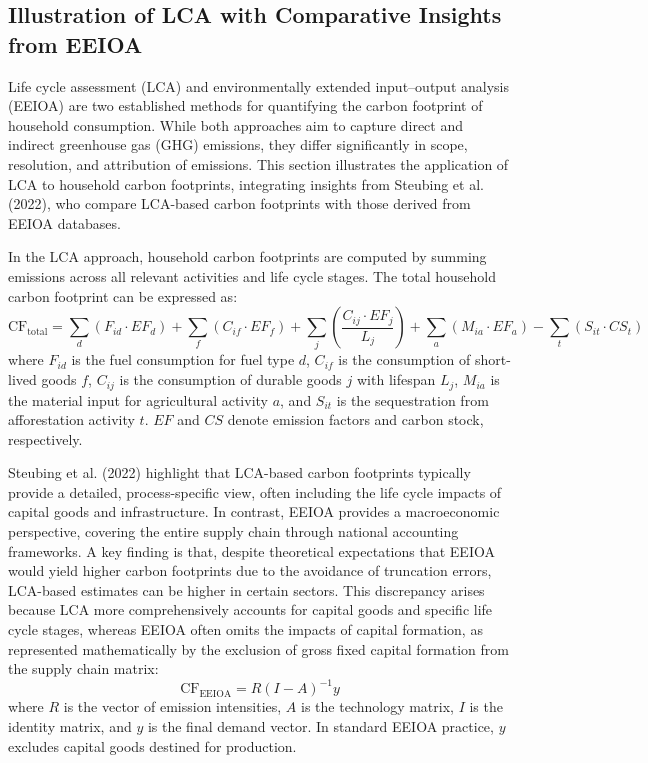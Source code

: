 \documentclass[12pt,a4paper]{article}%
\begin{document}
\subsection{Illustration of LCA with Comparative Insights from EEIOA}

Life cycle assessment (LCA) and environmentally extended input--output analysis (EEIOA) are two established methods for quantifying the carbon footprint of household consumption. While both approaches aim to capture direct and indirect greenhouse gas (GHG) emissions, they differ significantly in scope, resolution, and attribution of emissions. This section illustrates the application of LCA to household carbon footprints, integrating insights from Steubing et al. (2022), who compare LCA-based carbon footprints with those derived from EEIOA databases.

In the LCA approach, household carbon footprints are computed by summing emissions across all relevant activities and life cycle stages. The total household carbon footprint can be expressed as:
\begin{equation}
\text{CF}_{\text{total}} = \sum_d (F_{id} \cdot EF_d) 
+ \sum_f (C_{if} \cdot EF_f) 
+ \sum_j \left( \frac{C_{ij} \cdot EF_j}{L_j} \right)
+ \sum_a (M_{ia} \cdot EF_a)
- \sum_t (S_{it} \cdot CS_t)
\end{equation}
where $F_{id}$ is the fuel consumption for fuel type $d$, $C_{if}$ is the consumption of short-lived goods $f$, $C_{ij}$ is the consumption of durable goods $j$ with lifespan $L_j$, $M_{ia}$ is the material input for agricultural activity $a$, and $S_{it}$ is the sequestration from afforestation activity $t$. $EF$ and $CS$ denote emission factors and carbon stock, respectively.

Steubing et al. (2022) highlight that LCA-based carbon footprints typically provide a detailed, process-specific view, often including the life cycle impacts of capital goods and infrastructure. In contrast, EEIOA provides a macroeconomic perspective, covering the entire supply chain through national accounting frameworks. A key finding is that, despite theoretical expectations that EEIOA would yield higher carbon footprints due to the avoidance of truncation errors, LCA-based estimates can be higher in certain sectors. This discrepancy arises because LCA more comprehensively accounts for capital goods and specific life cycle stages, whereas EEIOA often omits the impacts of capital formation, as represented mathematically by the exclusion of gross fixed capital formation from the supply chain matrix:
\begin{equation}
\text{CF}_{\text{EEIOA}} = R {(I - A)}^{-1} y
\end{equation}
where $R$ is the vector of emission intensities, $A$ is the technology matrix, $I$ is the identity matrix, and $y$ is the final demand vector. In standard EEIOA practice, $y$ excludes capital goods destined for production.
\end{document}

